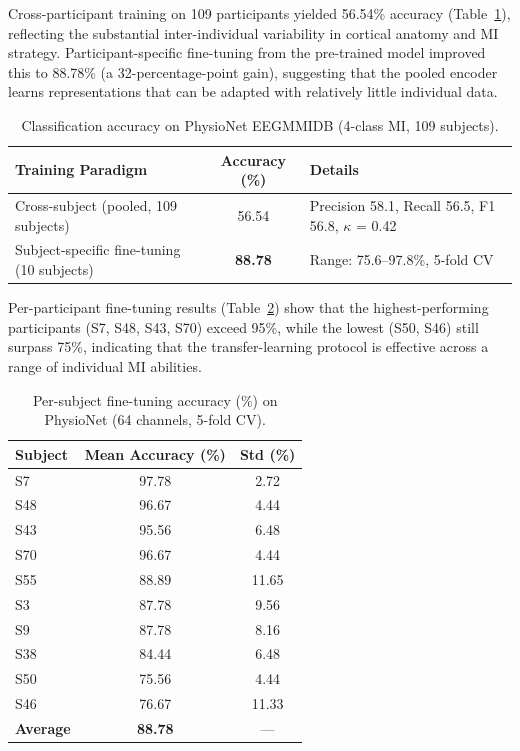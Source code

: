 \documentclass[12pt, a4paper]{article}
\begin{document}
Cross-participant training on 109 participants yielded 56.54\% accuracy (Table~\ref{tab:physionet_results}), reflecting the substantial inter-individual variability in cortical anatomy and MI strategy. Participant-specific fine-tuning from the pre-trained model improved this to 88.78\% (a 32-percentage-point gain), suggesting that the pooled encoder learns representations that can be adapted with relatively little individual data.

\begin{table}[htbp]
\centering
\caption{Classification accuracy on PhysioNet EEGMMIDB (4-class MI, 109 subjects).}
\label{tab:physionet_results}
\begin{tabular}{@{} l c >{\raggedright\arraybackslash}p{6.5cm} @{}}
\toprule
\textbf{Training Paradigm} & \textbf{Accuracy (\%)} & \textbf{Details} \\
\midrule
Cross-subject (pooled, 109 subjects) & 56.54 & Precision 58.1, Recall 56.5, F1 56.8, $\kappa$ = 0.42 \\
Subject-specific fine-tuning (10 subjects) & \textbf{88.78} & Range: 75.6--97.8\%, 5-fold CV \\
\bottomrule
\end{tabular}
\end{table}

Per-participant fine-tuning results (Table~\ref{tab:finetune_detail}) show that the highest-performing participants (S7, S48, S43, S70) exceed 95\%, while the lowest (S50, S46) still surpass 75\%, indicating that the transfer-learning protocol is effective across a range of individual MI abilities.

\begin{table}[htbp]
\centering
\caption{Per-subject fine-tuning accuracy (\%) on PhysioNet (64 channels, 5-fold CV).}
\label{tab:finetune_detail}
\begin{tabular}{lcc}
\toprule
\textbf{Subject} & \textbf{Mean Accuracy (\%)} & \textbf{Std (\%)} \\
\midrule
S7  & 97.78 & 2.72 \\
S48 & 96.67 & 4.44 \\
S43 & 95.56 & 6.48 \\
S70 & 96.67 & 4.44 \\
S55 & 88.89 & 11.65 \\
S3  & 87.78 & 9.56 \\
S9  & 87.78 & 8.16 \\
S38 & 84.44 & 6.48 \\
S50 & 75.56 & 4.44 \\
S46 & 76.67 & 11.33 \\
\midrule
\textbf{Average} & \textbf{88.78} & --- \\
\bottomrule
\end{tabular}
\end{table}
\end{document}
